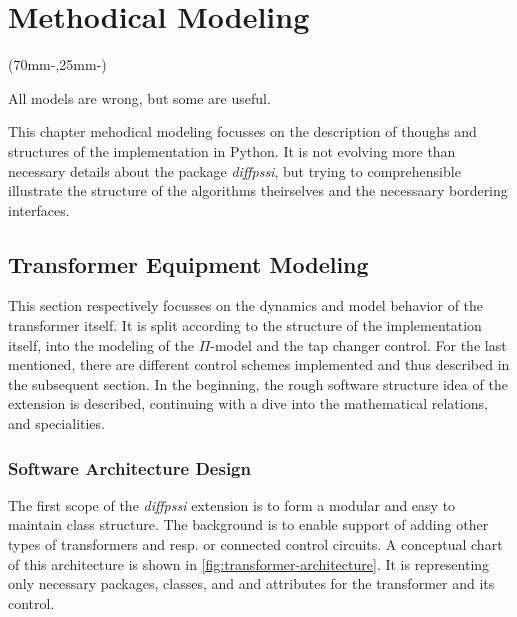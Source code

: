 
\chapter{Methodical Modeling}
\label{chap:methodical-modeling}

\begin{textblock*}{.7\textwidth}(70mm-\offset,25mm-\offset)
        \begin{fquote}
            All models are wrong, but some are useful.
        \end{fquote}
\end{textblock*}

This chapter mehodical modeling focusses on the description of thoughs and structures of the implementation in Python.
It is not evolving more than necessary details about the package {\itshape diffpssi}, but trying to comprehensible illustrate the structure of the algorithms theirselves and the necessaary bordering interfaces.

\section{Transformer Equipment Modeling}
\label{sec:transformer-modeling}

This section respectively focusses on the dynamics and model behavior of the transformer itself.
It is split according to the structure of the implementation itself, into the modeling of the $\Pi$-model and the tap changer control.
For the last mentioned, there are different control schemes implemented and thus described in the subsequent section.
In the beginning, the rough software structure idea of the extension is described, continuing with a dive into the mathematical relations, and specialities.  

\subsection{Software Architecture Design}
\label{sec:modeling-architecture}

The first scope of the \textit{diffpssi} extension is to form a modular and easy to maintain class structure. 
The background is to enable support of adding other types of transformers and resp. or connected control circuits.
A conceptual chart of this architecture is shown in \autoref{fig:transformer-architecture}.
It is representing only necessary packages, classes, and and attributes for the transformer and its control.

